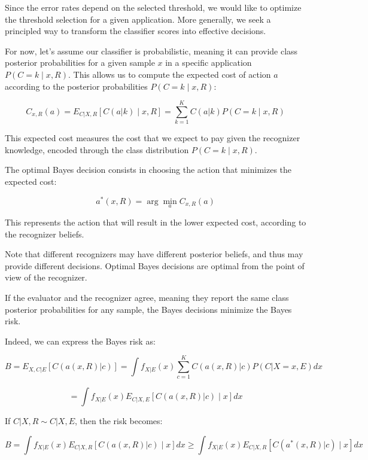 Since the error rates depend on the selected threshold, we would like to optimize the threshold selection for a given application. More generally, we seek a principled way to transform the classifier scores into effective decisions.

For now, let's assume our classifier is probabilistic, meaning it can provide class posterior probabilities for a given sample $x$ in a specific application $P(C = k \mid x, R)$. This allows us to compute the expected cost of action $a$ according to the posterior probabilities $P(C = k \mid x, R)$:

\begin{equation*}
C_{x,R}(a) = E_{C|X,R}[C(a|k)\mid x, R] = \sum_{k=1}^K C(a|k)P(C=k\mid x, R)
\end{equation*}

This expected cost measures the cost that we expect to pay given the recognizer knowledge, encoded through the class distribution $P(C = k \mid x, R)$.

The optimal Bayes decision consists in choosing the action that minimizes the expected cost:

\begin{equation*}
a^*(x, R) = \arg\min_a C_{x,R}(a)
\end{equation*}

This represents the action that will result in the lower expected cost, according to the recognizer beliefs.

Note that different recognizers may have different posterior beliefs, and thus may provide different decisions. Optimal Bayes decisions are optimal from the point of view of the recognizer.

If the evaluator and the recognizer agree, meaning they report the same class posterior probabilities for any sample, the Bayes decisions minimize the Bayes risk.

Indeed, we can express the Bayes risk as:

\begin{equation*}
B = E_{X,C|E}[C(a(x,R)|c)] = \int f_{X|E}(x) \sum_{c=1}^K C(a(x,R)|c)P(C|X=x,E)dx
\end{equation*}

\begin{equation*}
= \int f_{X|E}(x) E_{C|X,E}[C(a(x,R)|c)\mid x]dx
\end{equation*}

If $C|X, R \sim C|X, E$, then the risk becomes:

\begin{equation*}
B = \int f_{X|E}(x) E_{C|X,R}[C(a(x,R)|c)\mid x]dx \geq \int f_{X|E}(x) E_{C|X,R}[C(a^*(x,R)|c)\mid x]dx
\end{equation*}

